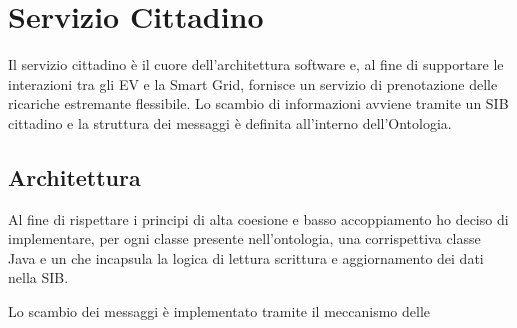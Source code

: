 \chapter{Servizio Cittadino}

Il servizio cittadino è il cuore dell'architettura software e, al fine di supportare le interazioni tra gli EV e la Smart Grid, fornisce un servizio di prenotazione delle ricariche estremante flessibile. Lo scambio di informazioni avviene tramite un SIB cittadino e la struttura dei messaggi è definita all'interno dell'Ontologia. 

\section{Architettura}

Al fine di rispettare i principi di alta coesione e basso accoppiamento ho deciso di implementare, per ogni classe presente nell'ontologia, una corrispettiva classe  Java e un  che incapsula la logica di lettura scrittura e aggiornamento dei dati nella SIB.

Lo scambio dei messaggi è implementato tramite il meccanismo delle   

